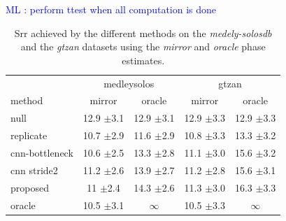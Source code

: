 \documentclass{article}
\newcommand{\ml}[1]{\textcolor{blue}{ML : #1}}
\begin{document}
 \ml{perform ttest when all computation is done}

\begin{table}
  \begin{center}
\begin{tabular}{lcc|cc}
  & \multicolumn{2}{c}{medleysolos} & \multicolumn{2}{c}{gtzan} \\
  method & mirror & oracle & mirror & oracle \\
\hline
null & 12.9 $\pm$3.1 & 12.9 $\pm$3.1 & 12.9 $\pm$3.3 &  12.9 $\pm$3.3\\
replicate & 10.7 $\pm$2.9 & 11.6 $\pm$2.9 & 10.8 $\pm$3.3 & 13.3 $\pm$3.2\\
\hline
cnn-bottleneck & 10.6 $\pm$2.5 &  13.3 $\pm$2.8 & 11.1 $\pm$3.0 & 15.6 $\pm$3.2 \\
cnn stride2 & 11.2 $\pm$2.6 & 13.9 $\pm$2.7 & 11.2 $\pm$2.8 & 15.6 $\pm$3.1 \\
\hline
proposed  & 11 $\pm$2.4 & 14.3 $\pm$2.6  & 11.3 $\pm$3.0 & 16.3 $\pm$3.3 \\
\hline
oracle & 10.5 $\pm$3.1 & $\infty$ & 10.5 $\pm$3.3 & $\infty$ \\
\end{tabular}
\caption{Srr achieved by the different methods on the \textit{medely-solosdb} and the \textit{gtzan} datasets using the \textit{mirror} and \textit{oracle} phase estimates.}
\label{tab:srr}
\end{center}
\vspace{-4mm}
\end{table}

\end{document}
